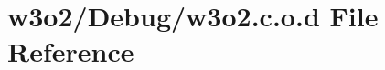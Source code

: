 \hypertarget{w3o2_8c_8o_8d}{}\section{w3o2/\+Debug/w3o2.c.\+o.\+d File Reference}
\label{w3o2_8c_8o_8d}
